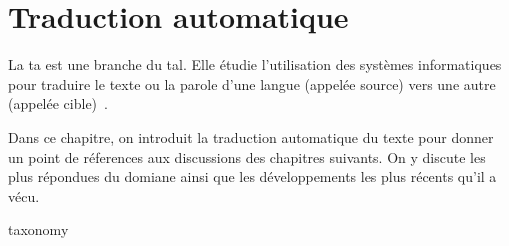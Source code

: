 \chapter{Traduction automatique}


La \acrfull{ta} est une branche du \acrfull{tal}.
Elle étudie l'utilisation des systèmes informatiques pour traduire le texte ou la parole d'une langue (appelée source) vers une autre (appelée cible)~\cite{routledge}.

Dans ce chapitre, on introduit la traduction automatique du texte pour donner un point de réferences aux discussions des chapitres suivants.
On y discute les plus répondues du domiane 
ainsi que les développements les plus récents qu'il a vécu.

{taxonomy}